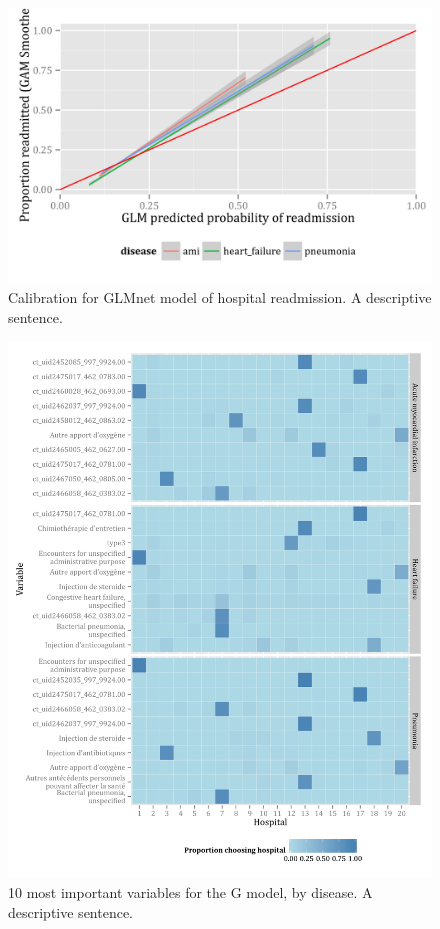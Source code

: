 \documentclass[]{article}\usepackage[]{graphicx}\usepackage[]{color}
\begin{document}
\begin{figure}[H]
    \includegraphics{../figures/glmnet_calibration.png}
    \caption[Calibration for GLMnet model of hospital readmission.]
      {Calibration for GLMnet model of hospital readmission. A descriptive sentence.}
    \label{fig:error_rate_for_hospital_choice}
\end{figure}

\begin{figure}[H]
    \includegraphics{../figures/top_10_variable_importance_and_hospital.png}
    \caption[Error rate for random forest model of hospital choice.]
      {10 most important variables for the G model, by disease. A descriptive sentence.}
    \label{fig:top_10_variable_importance_and_hospital}
\end{figure}
\end{document}
